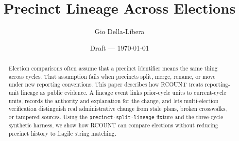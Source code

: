 \documentclass[12pt]{article}
\title{Precinct Lineage Across Elections}
\author{Gio Della-Libera}
\date{Draft --- \today}
\begin{document}
\maketitle

\begin{abstract}
Election comparisons often assume that a precinct identifier means the same
thing across cycles. That assumption fails when precincts split, merge, rename,
or move under new reporting conventions. This paper describes how RCOUNT treats
reporting-unit lineage as public evidence. A lineage event links prior-cycle
units to current-cycle units, records the authority and explanation for the
change, and lets multi-election verification distinguish real administrative
change from stale plans, broken crosswalks, or tampered sources. Using the
\texttt{precinct-split-lineage} fixture and the three-cycle synthetic harness,
we show how RCOUNT can compare elections without reducing precinct history to
fragile string matching.
\end{abstract}










\nocite{rcount-overview-2026,rcount-canvass-2026,rcount-substrate-2026}


\end{document}
